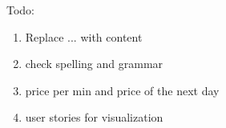 Todo:\\
\begin{enumerate}
	\item Replace ... with content
	\item check spelling and grammar
	\item price per min and price of the next day
	\item user stories for visualization
\end{enumerate}


